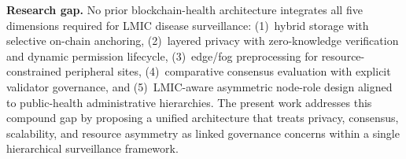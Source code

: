 \textbf{Research gap.} No prior blockchain-health architecture integrates all five dimensions required for LMIC disease surveillance: (1)~hybrid storage with selective on-chain anchoring, (2)~layered privacy with zero-knowledge verification and dynamic permission lifecycle, (3)~edge/fog preprocessing for resource-constrained peripheral sites, (4)~comparative consensus evaluation with explicit validator governance, and (5)~LMIC-aware asymmetric node-role design aligned to public-health administrative hierarchies. The present work addresses this compound gap by proposing a unified architecture that treats privacy, consensus, scalability, and resource asymmetry as linked governance concerns within a single hierarchical surveillance framework.

